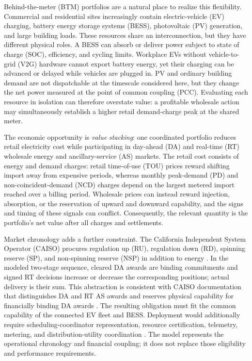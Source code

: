 \documentclass[final,5p,times]{elsarticle}
\begin{document}
Behind-the-meter (BTM) portfolios are a natural place to realize this flexibility. Commercial and residential sites increasingly contain electric-vehicle (EV) charging, battery energy storage systems (BESS), photovoltaic (PV) generation, and large building loads. These resources share an interconnection, but they have different physical roles. A BESS can absorb or deliver power subject to state of charge (SOC), efficiency, and cycling limits. Workplace EVs without vehicle-to-grid (V2G) hardware cannot export battery energy, yet their charging can be advanced or delayed while vehicles are plugged in. PV and ordinary building demand are not dispatchable at the timescale considered here, but they change the net power measured at the point of common coupling (PCC). Evaluating each resource in isolation can therefore overstate value: a profitable wholesale action may simultaneously establish a higher retail demand-charge peak at the shared meter.

The economic opportunity is \emph{value stacking}: one coordinated portfolio reduces retail electricity cost while participating in day-ahead (DA) and real-time (RT) wholesale energy and ancillary-service (AS) markets. The retail cost consists of energy and demand charges: retail time-of-use (TOU) prices reward shifting import away from expensive periods, whereas monthly peak-demand (PD) and non-coincident-demand (NCD) charges depend on the largest metered import reached over a billing period. Wholesale prices can instead reward injection, absorption, or the reservation of upward and downward capability, and the signs and timing of these signals can conflict. Consequently, the relevant quantity is the portfolio's net value after all charges and settlements.

Market chronology adds a further constraint. The California Independent System Operator (CAISO) procures regulation up (RU), regulation down (RD), spinning reserve (SP), and non-spinning reserve (NSP) in addition to energy \cite{caisoAncillary2026}. In the modeled two-stage sequence, cleared DA awards are binding commitments and signed RT decisions increase or decrease the corresponding positions; actual delivery is their sum. This abstraction is consistent with CAISO documentation that distinguishes DA and RT AS awards and reserves physical capability for financially binding DA awards \cite{caisoMarketOperations2026,caisoNGRCommitment2020}. The resulting obligation must fit the common capability of the connected EV fleet and BESS. Deployment would additionally require scheduling-coordinator representation, resource certification, telemetry, metering, and distribution-utility coordination \cite{caisoDER2026}. The model represents the operational chronology and financial coupling; it does not replace those eligibility and performance requirements.
\end{document}
